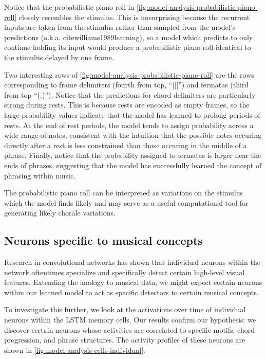 \documentclass[dissertation.tex]{subfiles}
\begin{document}
Notice that the probabilistic piano roll in
\cref{fig:model-analysis-probabilistic-piano-roll} closely resembles the
stimulus. This is unsurprising because the recurrent inputs are taken from the
stimulus rather than sampled from the model's predictions (a.k.a.
cite{williams1989learning}), so a model which predicts to only continue holding
its input would produce a probabilistic piano roll identical to the stimulus
delayed by one frame.

Two interesting rows of \cref{fig:model-analysis-probabilistic-piano-roll}
are the rows corresponding to frame delimiters (fourth from top, ``|||'') and
fermatas (third from top ``(.)''). Notice that the predictions for chord
delimiters are particularly strong during rests. This is because rests are
encoded as empty frames, so the large probability values indicate that the
model has learned to prolong periods of rests. At the end of rest periods, the
model tends to assign probability across a wide range of notes, consistent with
the intuition that the possible notes occuring directly after a rest is less
constrained than  those occuring in the middle of a
phrase. Finally, notice that the probability assigned to fermatas is larger
near the ends of phrases, suggesting that the model has successfully learned
the concept of phrasing within music.

The probabilistic piano roll can be interpreted as variations on the stimulus
which the model finds likely and may serve as a useful computational tool for
generating likely chorale variations.

\subsection{Neurons specific to musical concepts}

Research in convolutional networks has shown that individual neurons within the
network oftentimes specialize and specifically detect certain high-level visual
features. Extending the analogy to musical data, we
might expect certain neurons within our learned model to act as specific
detectors to certain musical concepts.

To investigate this further, we look at the activations over time of individual
neurons within the LSTM memory cells. Our results confirm our hypothesis: we
discover certain neurons whose activities are correlated to specific motifs,
chord progression, and phrase structures. The activity profiles of these
neurons are shown in \cref{fig:model-analysis-cells-individual}.
\end{document}
